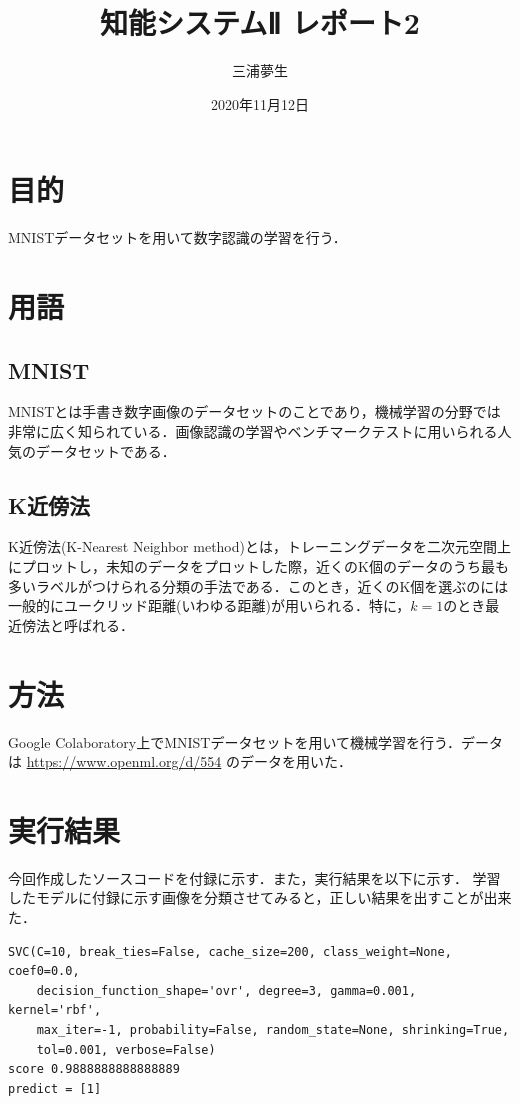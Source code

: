 \documentclass[a4paper, titlepage]{jsarticle}
\title{知能システムⅡ レポート2}
\author{三浦夢生}
\date{2020年11月12日}
\begin{document}
	\maketitle

	\section{目的}
	MNISTデータセットを用いて数字認識の学習を行う．

	\section{用語}
	\subsection{MNIST}
	MNISTとは手書き数字画像のデータセットのことであり，機械学習の分野では非常に広く知られている．画像認識の学習やベンチマークテストに用いられる人気のデータセットである．

	\subsection{K近傍法}
	K近傍法(K-Nearest Neighbor method)とは，トレーニングデータを二次元空間上にプロットし，未知のデータをプロットした際，近くのK個のデータのうち最も多いラベルがつけられる分類の手法である．このとき，近くのK個を選ぶのには一般的にユークリッド距離(いわゆる距離)が用いられる．特に，$k=1$のとき最近傍法と呼ばれる．

	\section{方法}
	Google Colaboratory上でMNISTデータセットを用いて機械学習を行う．データは
	\url{https://www.openml.org/d/554}
	のデータを用いた．

	\section{実行結果}
	今回作成したソースコードを付録に示す．また，実行結果を以下に示す．
	学習したモデルに付録に示す画像を分類させてみると，正しい結果を出すことが出来た．

	\begin{lstlisting}
SVC(C=10, break_ties=False, cache_size=200, class_weight=None, coef0=0.0,
    decision_function_shape='ovr', degree=3, gamma=0.001, kernel='rbf',
    max_iter=-1, probability=False, random_state=None, shrinking=True,
    tol=0.001, verbose=False)
score 0.9888888888888889
predict = [1]
	\end{lstlisting}
\end{document}

